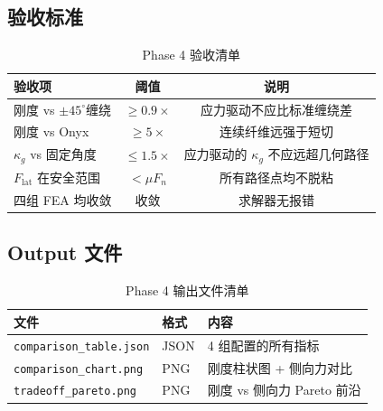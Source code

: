 \documentclass[11pt,a4paper]{article}
\begin{document}
\subsection{验收标准}

\begin{table}[H]
\centering
\begin{tabularx}{\textwidth}{X c c}
\toprule
\textbf{验收项} & \textbf{阈值} & \textbf{说明} \\
\midrule
刚度 vs $\pm 45^\circ$缠绕 & $\geq 0.9\times$ & 应力驱动不应比标准缠绕差 \\
刚度 vs Onyx & $\geq 5\times$ & 连续纤维远强于短切 \\
$\kappa_g$ vs 固定角度 & $\leq 1.5\times$ & 应力驱动的 $\kappa_g$ 不应远超几何路径 \\
$F_{\text{lat}}$ 在安全范围 & $< \mu F_n$ & 所有路径点均不脱粘 \\
四组 FEA 均收敛 & 收敛 & 求解器无报错 \\
\bottomrule
\end{tabularx}
\caption{Phase 4 验收清单}
\end{table}

\subsection{Output 文件}

\begin{table}[H]
\centering
\begin{tabular}{l l l}
\toprule
\textbf{文件} & \textbf{格式} & \textbf{内容} \\
\midrule
\texttt{comparison\_table.json} & JSON & 4 组配置的所有指标 \\
\texttt{comparison\_chart.png} & PNG & 刚度柱状图 + 侧向力对比 \\
\texttt{tradeoff\_pareto.png} & PNG & 刚度 vs 侧向力 Pareto 前沿 \\
\bottomrule
\end{tabular}
\caption{Phase 4 输出文件清单}
\end{table}
\end{document}
